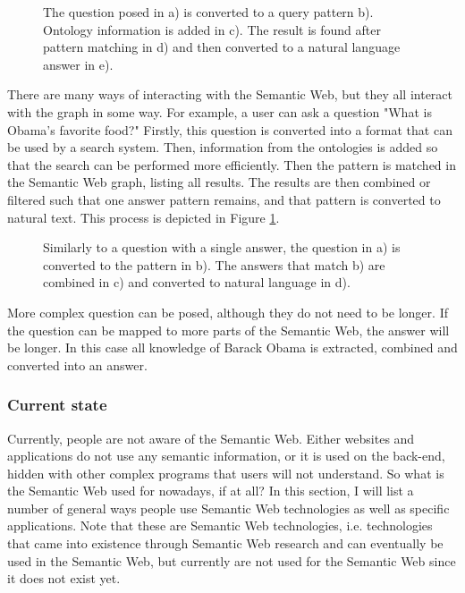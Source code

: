\documentclass{article}
\begin{document}
 \begin{figure}[H]
 \centering
 \caption[Graph question example]{The question posed in a) is converted to a query pattern b). Ontology information is added in c). The result is found after pattern matching in d) and then converted to a natural language answer in e).}
 \label{question_graph}
 \end{figure}
 
 There are many ways of interacting with the Semantic Web, but they all interact with the graph in some way. For example, a user can ask a question "What is Obama's favorite food?" Firstly, this question is converted into a format that can be used by a search system. Then, information from the ontologies is added so that the search can be performed more efficiently. Then the pattern is matched in the Semantic Web graph, listing all results. The results are then combined or filtered such that one answer pattern remains, and that pattern is converted to natural text. This process is depicted in Figure \ref{question_graph}.

 \begin{figure}[H]
 \centering
 \caption[Graph biography example]{Similarly to a question with a single answer, the question in a) is converted to the pattern in b). The answers that match b) are combined in c) and converted to natural language in d).}
 \label{question_graph2}
 \end{figure}
 
 More complex question can be posed, although they do not need to be longer. If the question can be mapped to more parts of the Semantic Web, the answer will be longer. In this case all knowledge of Barack Obama is extracted, combined and converted into an answer.
 
 \subsubsection{Current state}
 Currently, people are not aware of the Semantic Web. Either websites and applications do not use any semantic information, or it is used on the back-end, hidden with other complex programs that users will not understand. So what is the Semantic Web used for nowadays, if at all? In this section, I will list a number of general ways people use Semantic Web technologies as well as specific applications. Note that these are Semantic Web technologies, i.e. technologies that came into existence through Semantic Web research and can eventually be used in the Semantic Web, but currently are not used for the Semantic Web since it does not exist yet.
\end{document}
